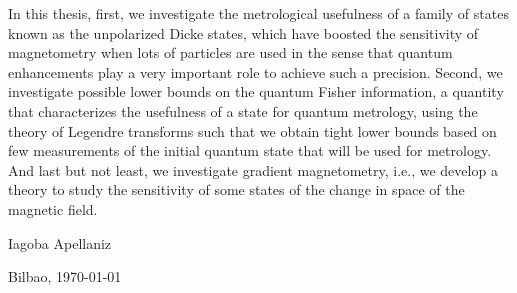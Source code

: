 In this thesis, first, we investigate the metrological usefulness of a family of states known as the unpolarized Dicke states, which have boosted the sensitivity of magnetometry when lots of particles are used in the sense that quantum enhancements play a very important role to achieve such a precision.
Second, we investigate possible lower bounds on the quantum Fisher information, a quantity that characterizes the usefulness of a state for quantum metrology, using the theory of Legendre transforms such that we obtain tight lower bounds based on few measurements of the initial quantum state that will be used for metrology.
And last but not least, we investigate gradient magnetometry, i.e., we develop a theory to study the sensitivity of some states of the change in space of the magnetic field.

\begin{flushright}
  Iagoba Apellaniz

  Bilbao, \today
\end{flushright}

